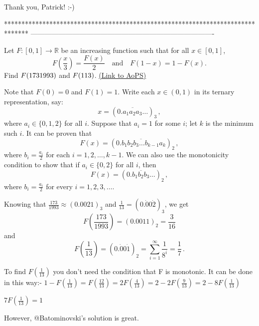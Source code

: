 \begin{solution}
	Thank you, Patrick! :-)
\end{solution}
*******************************************************************************
-------------------------------------------------------------------------------

\begin{problem}
	Let $F: [0,1] \to \mathbb R$ be an increasing function such that for all $x \in [0, 1]$,
\[F\left(\frac{x}{3}\right)=\frac{F(x)}{2} \quad \text{and} \quad F(1-x)=1-F(x).\]
Find $ F(173\/1993)$ and $ F(1\/13)$.
	\flushright \href{https://artofproblemsolving.com/community/c6h393366}{(Link to AoPS)}
\end{problem}



\begin{solution}
	Note that $F(0)=0$ and $F(1)=1$.  Write each $x\in(0,1)$ in its ternary representation, say:
\[x=\left(\overline{0.a_1a_2a_3\ldots}\right)_3\,,\]
where $a_i \in \{0,1,2\}$ for all $i$.  Suppose that $a_i=1$ for some $i$; let $k$ is the minimum such $i$.  It can be proven that
\[F(x)=\left(\overline{0.b_1b_2b_3 \ldots b_{k-1}a_k}\right)_2\,,\]
where $b_i=\frac{a_i}{2}$ for each $i=1,2,\ldots,k-1$.  We can also use the monotonicity condition to show that if $a_i\in\{0,2\}$ for all $i$, then
\[F(x)=\left(\overline{0.b_1b_2b_3 \ldots }\right)_2\,,\]
where $b_i=\frac{a_i}{2}$ for every $i=1,2,3,\ldots$.

Knowing that $\frac{173}{1993}\approx\left(0.0021\right)_3$ and $\frac{1}{13}=\left(0.\dot{0}0\dot{2}\right)_3$, we get
\[F\left(\frac{173}{1993}\right) = \left(0.0011\right)_2 = \frac{3}{16}\]
and
\[F\left(\frac{1}{13}\right) = \left(0.\dot{0}0\dot{1}\right)_2=\sum_{i=1}^\infty \frac{1}{8^i} = \frac{1}{7}\,.\]
\end{solution}



\begin{solution}
	To find $ F(\frac {1}{13}) $ you don't need the condition that F is monotonic.
It can be done in this way:-
$ 1-F(\frac {1}{13})=F(\frac {12}{13})=2F(\frac {4}{13})=2-2F(\frac {9}{13})=2-8F(\frac {1}{13}) $

$ 7F(\frac {1}{13})=1 $

However, @Batominovski's solution is great.
\end{solution}



